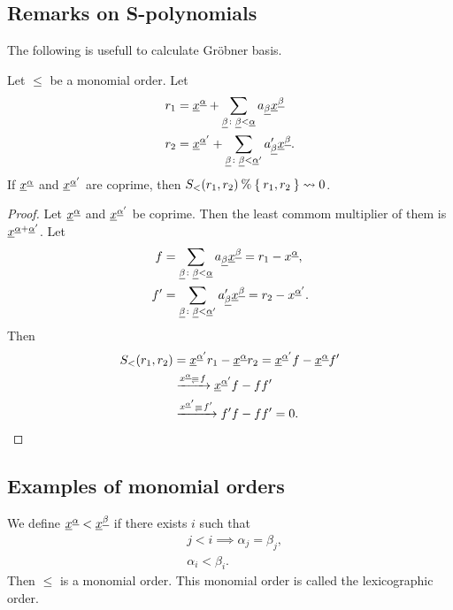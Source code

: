 \subsection{Remarks on S-polynomials}
The following is usefull to calculate Gr\"obner basis.
\begin{lemma}
  Let $\leq$ be a monomial order.
  Let
  \begin{align*}
    r_1&={\underline{x}}^{\underline{\alpha}} +\sum_{{\underline{\beta}}\colon{\underline{\beta}}<{\underline{\alpha}}} a_{\underline{\beta}} {\underline{x}}^{\underline{\beta}}\\
    r_2&={\underline{x}}^{{\underline{\alpha}}'} +\sum_{{\underline{\beta}}\colon{\underline{\beta}}<{\underline{\alpha}}'} a'_{\underline{\beta}} {\underline{x}}^{\underline{\beta}}.
  \end{align*}
  If ${\underline{x}}^{\underline{\alpha}}$ and ${\underline{x}}^{{\underline{\alpha}}'}$ are coprime,
  then $S_<(r_1,r_2)\mathbin{\%}\Set{r_1,r_2}\leadsto 0$.
\end{lemma}
\begin{proof}
  Let ${\underline{x}}^{\underline{\alpha}}$ and ${\underline{x}}^{{\underline{\alpha}}'}$ be coprime.
  Then the least commom multiplier of them is ${\underline{x}}^{{\underline{\alpha}}+{\underline{\alpha}}'}$.
  Let
  \begin{align*}
    f&=\sum_{{\underline{\beta}}\colon{\underline{\beta}}<{\underline{\alpha}}} a_{\underline{\beta}} {\underline{x}}^{\underline{\beta}}
    =r_1-x^{\underline{\alpha}},\\
    f'&=\sum_{{\underline{\beta}}\colon{\underline{\beta}}<{\underline{\alpha}}'} a'_{\underline{\beta}} {\underline{x}}^{\underline{\beta}}
        =r_2-x^{{\underline{\alpha}}'}.
  \end{align*}
  Then
  \begin{align*}
    S_<(r_1,r_2)
    &=\xxx^{\aaalpha'}r_1-\xxx^{\aaalpha}r_2
    =\xxx^{\aaalpha'}f-\xxx^{\aaalpha}f'\\
    &\xrightarrow{x^\aaalpha\Denotes f}
    \xxx^{\aaalpha'}f-ff'\\
    &\xrightarrow{x^{\aaalpha'}\Denotes f'}
    f'f-ff'=0.
  \end{align*}
\end{proof}

\subsection{Examples of monomial orders}
\begin{example}
  We define ${\underline{x}}^{\underline{\alpha}} < {\underline{x}}^{\underline{\beta}} $
  if there exists $i$ such that
  \begin{align*}
    &j<i\implies \alpha_j=\beta_j,\\
    &\alpha_i < \beta_i.
  \end{align*}
  Then $\leq$ is a monomial order.
  This monomial order is called the lexicographic order.
\end{example}

